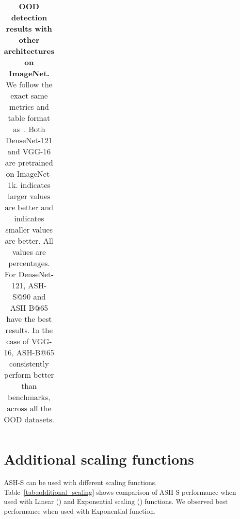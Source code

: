 \documentclass{article}
\newcommand{\tablabel}[1]{\label{tab:#1}}
\newcommand{\tabref}[1]{Table~\ref{tab:#1}}
\begin{document}
\begin{table}[hbt!]
{\begin{tabular}{c c c c c c c c c c c c}
\end{tabular}}
\caption{\textbf{OOD detection results with other architectures on ImageNet.} We follow the exact same metrics and table format as~\citet{react}. Both DenseNet-121 and VGG-16 are pretrained on ImageNet-1k.  indicates larger values are better and  indicates smaller values are better. All values are percentages. For DenseNet-121, ASH-S@90 and ASH-B@65 have the best results. In the case of VGG-16, ASH-B@65 consistently perform better than benchmarks, across all the OOD datasets.}
\tablabel{other_architectures}

\end{table}


\section{Additional scaling functions}
ASH-S can be used with different scaling functions. \tabref{additional_scaling} shows comparison of ASH-S performance when used with Linear () and Exponential scaling () functions. We observed best performance when used with Exponential function.


\begin{table}[hbt!]
\caption{\textbf{Comparison of different scaling functions used with ASH-S.} }
\tablabel{additional_scaling}

\end{table}
\end{document}

